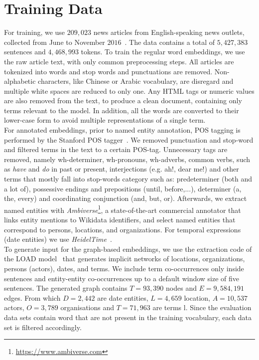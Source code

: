 \section{Training Data}\label{sec:data}
For training, we use $209,023$ news articles from English-speaking news outlets, collected from June to November $2016$~. The data contains a total of $5,427,383$ sentences and $4,468,993$ tokens. To train the regular word embeddings, we use the raw article text, with only common preprocessing steps. All articles are tokenized into words and stop words and punctuations are removed. Non-alphabetic characters, like Chinese or Arabic vocabulary, are disregard and multiple white spaces are reduced to only one.  Any HTML tags or numeric values are also removed from the text, to produce a clean document, containing only terms relevant to the model. In addition, all the words are converted to their lower-case form to avoid multiple representations of a single term.\\
For annotated embeddings, prior to named entity annotation, POS tagging is performed by   the Stanford POS tagger~. 
We removed punctuation and stop-word and filtered terms in the text to a certain POS-tag. Unnecessary tags are removed, namely  wh-determiner, wh-pronouns, wh-adverbs, common verbs, such as  \emph{have} and  \emph{do} in past or present, interjections (e.g. ah!, dear me!) and other terms that mostly fall into stop-words category such as: predeterminer (both and a lot of), possessive endings and prepositions (until, before,...), determiner (a, the, every) and coordinating conjunction (and, but, or). Afterwards, we extract named entities with \emph{Ambiverse}\footnote{\url{https://www.ambiverse.com}}, a state-of-the-art commercial annotator that links entity mentions to Wikidata identifiers, and select named entities that correspond to persons, locations, and organizations. For temporal expressions (date entities) we use \emph{HeidelTime}~.\\
To generate input for the graph-based embeddings, we use the extraction code of the LOAD model~ that generates implicit networks of locations, organizations, persons (actors), dates, and terms. 
We include term co-occurrences only inside sentences and entity-entity co-occurrences up to a default window size of five sentences. The generated graph contains $T=93,390$ nodes and $E=9,584,191$ edges. From which $D=2,442$  are date entities, $L=4,659$ location, $A=10,537$ actors, $O=3,789$ organisations and $T=71,963$ are terms l.
Since the evaluation data sets contain word that are not present in the training vocabulary, each data set is filtered accordingly.
